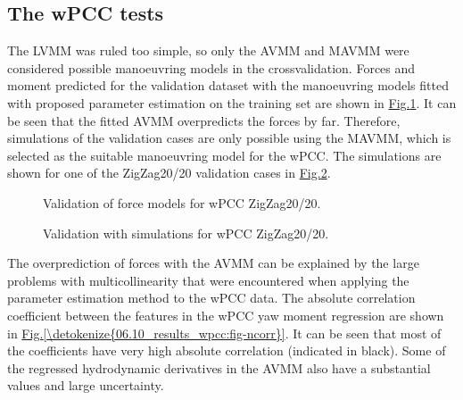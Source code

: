 \documentclass[review]{elsarticle}
\begin{document}
\subsection{The wPCC tests}
\label{\detokenize{06.10_results_wpcc:the-wpcc-tests}}\label{\detokenize{06.10_results_wpcc::doc}}
\sphinxAtStartPar
The LVMM was ruled too simple, so only the AVMM and MAVMM were considered possible manoeuvring models in the cross\sphinxhyphen{}validation.
Forces and moment predicted for the validation dataset with the manoeuvring models fitted with proposed parameter estimation on the training set are shown in \hyperref[\detokenize{06.10_results_wpcc:fig-validation-forces}]{Fig.\@ \ref{\detokenize{06.10_results_wpcc:fig-validation-forces}}}. It can be seen that the fitted AVMM overpredicts the forces by far. Therefore, simulations of the validation cases are only possible using the MAVMM, which is selected as the suitable manoeuvring model for the wPCC.
The simulations are shown for one of the ZigZag20/20 validation cases in \hyperref[\detokenize{06.10_results_wpcc:fig-validation-sim}]{Fig.\@ \ref{\detokenize{06.10_results_wpcc:fig-validation-sim}}}.

\begin{figure}[H]
\centering
\capstart

\noindent{}
\caption{Validation of force models for wPCC ZigZag20/20.}\label{\detokenize{06.10_results_wpcc:fig-validation-forces}}\end{figure}

\begin{figure}[H]
\centering
\capstart

\noindent{}
\caption{Validation with simulations for wPCC ZigZag20/20.}\label{\detokenize{06.10_results_wpcc:fig-validation-sim}}\end{figure}

\sphinxAtStartPar
The over\sphinxhyphen{}prediction of forces with the AVMM can be explained by the large problems with multicollinearity that were encountered when applying the parameter estimation method to the wPCC data. The absolute correlation coefficient between the features in the wPCC yaw moment regression are shown in \hyperref[\detokenize{06.10_results_wpcc:fig-ncorr}]{Fig.\@ \ref{\detokenize{06.10_results_wpcc:fig-ncorr}}}. It can be seen that most of the coefficients have very high absolute correlation (indicated in black). Some of the regressed hydrodynamic derivatives in the AVMM also have a substantial values and large uncertainty.
\end{document}
